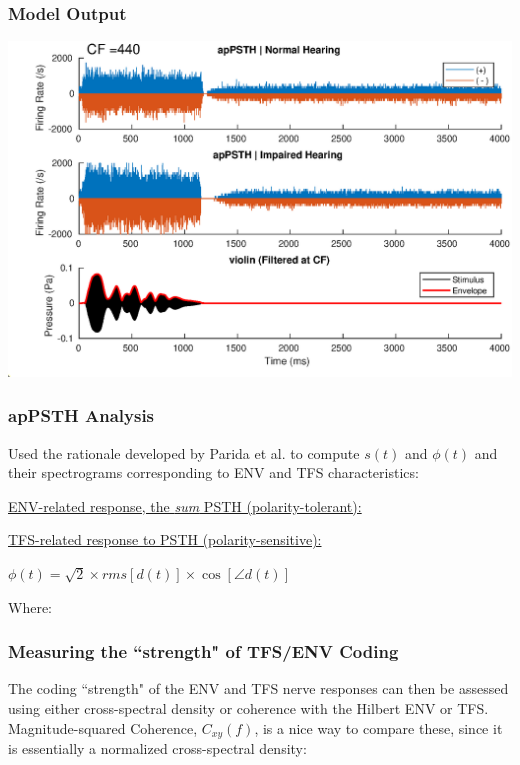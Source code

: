 \documentclass[aspectratio=1610]{beamer}
\begin{document}
\begin{frame}
\frametitle{Model Output}
\includegraphics[width = .88\textwidth]{apPSTH_violin}
\end{frame}

\begin{frame}

\frametitle{apPSTH Analysis}

Used the rationale developed by Parida et al. to compute $s(t)$ and $\phi (t)$ and their spectrograms corresponding to ENV and TFS characteristics:\vspace{1em}

\underline{ENV-related response, the \textit{sum} PSTH (polarity-tolerant):}\\
\begin{center}
\end{center}

\underline{TFS-related response to PSTH (polarity-sensitive):}\\
\begin{center}

$\phi (t) = \sqrt{2} \times rms[d(t)] \times \cos[\angle d(t)]$\\
\end{center}

Where:
 \begin{center}
\end{center}

\end{frame}

\begin{frame}

\frametitle{Measuring the ``strength" of TFS/ENV Coding}

The coding ``strength" of the ENV and TFS nerve responses can then be assessed using either cross-spectral density or coherence with the Hilbert ENV or TFS. Magnitude-squared Coherence, $C_{xy}(f)$, is a nice way to compare these, since it is essentially a normalized cross-spectral density:\vspace{2em}

\begin{center}
\end{center}

\end{frame}
\end{document}
